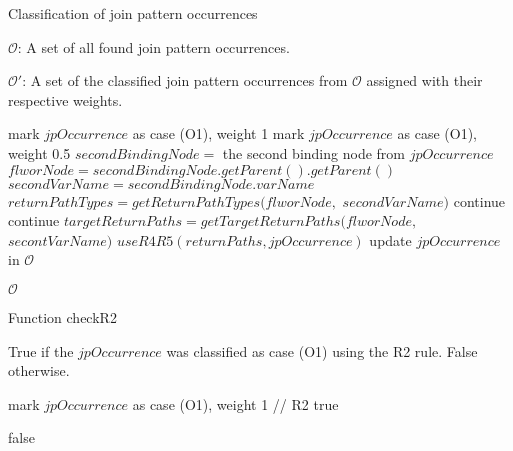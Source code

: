 \begin{algorithm}
\caption{Classification of join pattern occurrences}
\label{ALG_classification_of_join_pattern_occurrences}
\begin{algorithmic}[1]
\REQUIRE $\mathcal{O}$: A set of all found join pattern occurrences.

\ENSURE $\mathcal{O'}$: A set of the classified join pattern occurrences from $\mathcal{O}$ assigned with their respective weights.

        \STATE mark $jpOccurrence$ as case (O1), weight 1
        \STATE mark $jpOccurrence$ as case (O1), weight 0.5
    \ELSE
        \STATE $secondBindingNode =$ the second binding node from $jpOccurrence$
        \STATE $flworNode = secondBindingNode.getParent().getParent()$
        \STATE $secondVarName = secondBindingNode.varName$
        \STATE $returnPathTypes = getReturnPathTypes(flworNode,$ $secondVarName)$
			\STATE continue
		\ENDIF
			\STATE continue
		\ENDIF
		\STATE $targetReturnPaths = getTargetReturnPaths(flworNode,$ $secontVarName)$
		\STATE $useR4R5(returnPaths, jpOccurrence)$
    \ENDIF
    \STATE update $jpOccurrence$ in $\mathcal{O}$
\ENDFOR

\RETURN $\mathcal{O}$
\end{algorithmic}
\end{algorithm}

\begin{algorithm}
\caption{Function checkR2}
\label{ALG_function_check_r2}
\begin{algorithmic}[1]

\ENSURE True if the $jpOccurrence$ was classified as case (O1) using the R2 rule. False otherwise.

    	\STATE mark $jpOccurrence$ as case (O1), weight 1 // R2
  		\RETURN true
  	\ENDIF
\ENDFOR

\RETURN false
\end{algorithmic}
\end{algorithm}

